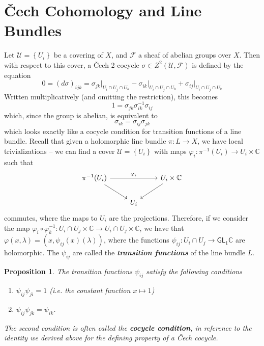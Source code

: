 \documentclass[psamsfonts, 12pt]{amsart}
\newtheorem{prop}[thm]{Proposition}
\theoremstyle{definition}
\theoremstyle{remark}
\newcommand{\ib}[1]{\textbf{\textit{#1}}}
\newcommand{\C}{\mathbb{C}}
\newcommand{\GL}{\mathsf{GL}}
\newcommand{\inv}{^{-1}}
\newcommand{\set}[1]{\left\lbrace #1 \right\rbrace}
\begin{document}
\section{\v{C}ech Cohomology and Line Bundles}
%
Let $\mathcal{U} = \set{U_i}$ be a covering of $X$, and $\mathcal{F}$ a sheaf
of abelian groups over $X$. Then with respect to this cover, a \v{C}ech 2-cocycle
$\sigma \in Z^2(\mathcal{U}, \mathcal{F})$ is defined by the equation
\[
0 = (d\sigma)_{ijk} = \sigma_{jk}\vert_{U_i \cap U_j \cap U_k}
- \sigma_{ik}\vert_{U_i \cap U_j \cap U_k} + \sigma_{ij}\vert_{U_i \cap U_j \cap U_k}
\]
Written multiplicatively (and omitting the restriction), this becomes
\[
1 = \sigma_{jk}\sigma_{ik}\inv\sigma_{ij}
\]
which, since the group is abelian, is equivalent to
\[
\sigma_{ik} = \sigma_{ij}\sigma_{jk}
\]
which looks exactly like a cocycle condition for transition functions of a line
bundle. Recall that given a holomorphic line bundle $\pi : L \to X$, we have local
trivializations -- we can find a cover $\mathcal{U} = \set{U_i}$ with maps
$\varphi_i : \pi\inv(U_i) \to U_i \times \C$ such that
\[\begin{tikzcd}
\pi\inv(U_i) \ar[rr, "\varphi_i"] \ar[dr] & & U_i \times \C \ar[dl] \\
& U_i
\end{tikzcd}\]
commutes, where the maps to $U_i$ are the projections. Therefore, if we consider
the map
$\varphi_i \circ \varphi_k\inv : U_i \cap U_j \times \C \to U_i \cap U_j \times \C$,
we have that $\varphi(x, \lambda) = (x, \psi_{ij}(x)(\lambda))$, where the functions
$\psi_{ij} : U_i\cap U_j \to \GL_1\C$ are holomorphic. The $\psi_{ij}$
are called the \ib{transition functions} of the line bundle $L$.
%
\begin{prop}
The transition functions $\psi_{ij}$ satisfy the following conditions
\begin{enumerate}
  \item $\psi_{ij}\psi_{ji} = 1$ (i.e. the constant function $x \mapsto 1$)
  \item $\psi_{ij}\psi_{jk} = \psi_{ik}$.
\end{enumerate}
The second condition is often called the \ib{cocycle condition}, in reference to the
identity we derived above for the defining property of a \v{C}ech cocycle.
\end{prop}
%
\end{document}
